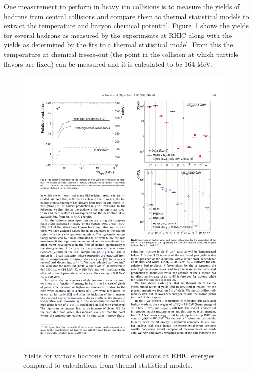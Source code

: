 One measurement to perform in heavy ion collisions is to measure the yields of hadrons from central collisions and compare them to thermal statistical models to extract the temperature and baryon chemical potential. Figure~\ref{fig:hadron_yields} shows the yields for several hadrons as measured by the experiments at RHIC along with the yields as determined by the fits to a thermal statistical model. From this the temperature at chemical freeze-out (the point in the collision at which particle flavors are fixed) can be measured and it is calculated to be 164 MeV.

\begin{figure}[htbp]
\begin{center}
\includegraphics[scale=1.2]{Plots/Intro/had_yields.pdf}
\end{center}
\caption[Hadron Yields]{Yields for various hadrons in central collisions at RHIC energies compared to calculations from themal statistical models.}
\label{fig:hadron_yields}
\end{figure}

